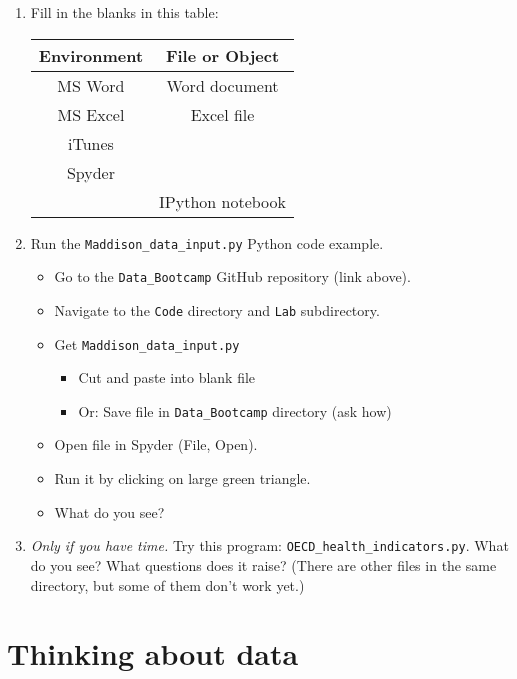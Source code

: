 \documentclass[11pt]{article}
\begin{document}
\begin{enumerate}

\item Fill in the blanks in this table:

\begin{center}
\begin{tabular}{cc}
\toprule
Environment & File or Object \\
\midrule
MS Word  & Word document  \\
MS Excel & Excel file     \\
iTunes & \\
Spyder   &                \\
         & IPython notebook \\
\bottomrule
\end{tabular}
\end{center}


\item Run the \verb|Maddison_data_input.py| Python code example.
\begin{itemize}
\item Go to the \verb|Data_Bootcamp| GitHub repository (link above).
\item Navigate to the {\tt Code} directory and {\tt Lab} subdirectory.
\item Get \verb|Maddison_data_input.py|
\begin{itemize}
\item Cut and paste into blank file
\item Or:  Save file in \verb|Data_Bootcamp| directory (ask how)
\end{itemize}
\item Open file in Spyder (File, Open).
\item Run it by clicking on large green triangle.
\item What do you see?
\end{itemize}

\item {\it Only if you have time.\/} Try this program: \verb|OECD_health_indicators.py|.
What do you see?  What questions does it raise?
(There are other files in the same directory, but some of them don't work yet.)
\end{enumerate}


\section*{Thinking about data}
\end{document}
